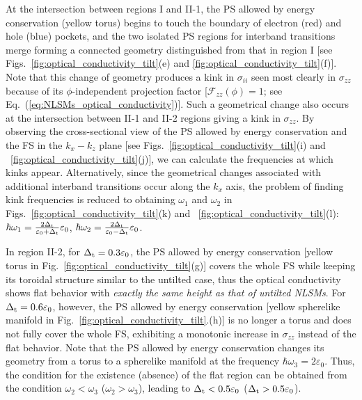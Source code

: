 \documentclass[aps,twocolumn,floatfix]{revtex4-1}
\begin{document}
At the intersection between regions I and II-1, the PS allowed by energy conservation (yellow torus) begins to touch the boundary of electron (red) and hole (blue) pockets, and the two isolated PS regions for interband transitions merge forming a connected geometry distinguished from that in region I [see Figs.~\ref{fig:optical_conductivity_tilt}(e) and \ref{fig:optical_conductivity_tilt}(f)].
Note that this change of geometry produces a kink in $\sigma_{ii}$ seen most clearly in $\sigma_{zz}$ because of its $\phi$-independent projection factor [$\mathcal{F}_{zz}(\phi)=1$; see Eq.~(\ref{eq:NLSMs_optical_conductivity})].
Such a geometrical change also occurs at the intersection between II-1 and II-2 regions giving a kink in $\sigma_{zz}$. By observing the cross-sectional view of the PS allowed by energy conservation and the FS in the $k_x-k_z$ plane [see Figs.~\ref{fig:optical_conductivity_tilt}(i) and ~\ref{fig:optical_conductivity_tilt}(j)], we can calculate the frequencies at which kinks appear. Alternatively, since the geometrical changes associated with additional interband transitions occur along the $k_x$ axis, the problem of finding kink frequencies is reduced to obtaining $\omega_1$ and $\omega_2$ in Figs.~\ref{fig:optical_conductivity_tilt}(k) and ~\ref{fig:optical_conductivity_tilt}(l): $\hbar\omega_1=\frac{2\Delta_{\rm t}}{\varepsilon_0 + \Delta_{\rm t}}\varepsilon_0$, $\hbar\omega_2=\frac{2\Delta_{\rm t}}{\varepsilon_0 - \Delta_{\rm t}}\varepsilon_0$. 


In region II-2, for $\Delta_{\rm t}=0.3\varepsilon_0$, the PS allowed by energy conservation [yellow torus in Fig.~\ref{fig:optical_conductivity_tilt}(g)] covers the whole FS while keeping its toroidal structure similar to the untilted case, thus the optical conductivity shows flat behavior with {\it exactly the same height as that of untilted NLSMs}. For $\Delta_{\rm t}=0.6\varepsilon_0$, however, the PS allowed by energy conservation [yellow spherelike manifold in Fig.~\ref{fig:optical_conductivity_tilt}.(h)] is no longer a torus and does not fully cover the whole FS, exhibiting a monotonic increase in $\sigma_{zz}$ instead of the flat behavior. Note that the PS allowed by energy conservation changes its geometry from a torus to a spherelike manifold at the frequency $\hbar\omega_3=2\varepsilon_0$. Thus, the condition for the existence (absence) of the flat region can be obtained from the condition $\omega_2<\omega_3$ ($\omega_2>\omega_3$), leading to $\Delta_{\rm t}<0.5 \varepsilon_0$ ($\Delta_{\rm t}>0.5 \varepsilon_0$).
\end{document}
